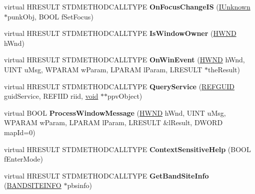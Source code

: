 \begin{DoxyCompactItemize}
\mbox{\label{class_c_menu_site_a1c7703680a564c6ca4ec738bc407d123}} 
virtual H\+R\+E\+S\+U\+LT S\+T\+D\+M\+E\+T\+H\+O\+D\+C\+A\+L\+L\+T\+Y\+PE {\bfseries On\+Focus\+Change\+IS} (\hyperlink{interface_i_unknown}{I\+Unknown} $\ast$punk\+Obj, B\+O\+OL f\+Set\+Focus)
\item 
\mbox{\label{class_c_menu_site_a9c4a22553dc2d656175490a6fb8f8219}} 
virtual H\+R\+E\+S\+U\+LT S\+T\+D\+M\+E\+T\+H\+O\+D\+C\+A\+L\+L\+T\+Y\+PE {\bfseries Is\+Window\+Owner} (\hyperlink{interfacevoid}{H\+W\+ND} h\+Wnd)
\item 
\mbox{\label{class_c_menu_site_a88747fce17098e675ace25ba0f56134f}} 
virtual H\+R\+E\+S\+U\+LT S\+T\+D\+M\+E\+T\+H\+O\+D\+C\+A\+L\+L\+T\+Y\+PE {\bfseries On\+Win\+Event} (\hyperlink{interfacevoid}{H\+W\+ND} h\+Wnd, U\+I\+NT u\+Msg, W\+P\+A\+R\+AM w\+Param, L\+P\+A\+R\+AM l\+Param, L\+R\+E\+S\+U\+LT $\ast$the\+Result)
\item 
\mbox{\label{class_c_menu_site_a1f7cc371685ec5842a9d208fd50d99c5}} 
virtual H\+R\+E\+S\+U\+LT S\+T\+D\+M\+E\+T\+H\+O\+D\+C\+A\+L\+L\+T\+Y\+PE {\bfseries Query\+Service} (\hyperlink{struct___g_u_i_d}{R\+E\+F\+G\+U\+ID} guid\+Service, R\+E\+F\+I\+ID riid, \hyperlink{interfacevoid}{void} $\ast$$\ast$ppv\+Object)
\item 
\mbox{\label{class_c_menu_site_a8d4332503f6746e9443c902bd668edee}} 
virtual B\+O\+OL {\bfseries Process\+Window\+Message} (\hyperlink{interfacevoid}{H\+W\+ND} h\+Wnd, U\+I\+NT u\+Msg, W\+P\+A\+R\+AM w\+Param, L\+P\+A\+R\+AM l\+Param, L\+R\+E\+S\+U\+LT \&l\+Result, D\+W\+O\+RD map\+Id=0)
\item 
\mbox{\label{class_c_menu_site_a62e0f7f91bcb8cd8c601463cb623179f}} 
virtual H\+R\+E\+S\+U\+LT S\+T\+D\+M\+E\+T\+H\+O\+D\+C\+A\+L\+L\+T\+Y\+PE {\bfseries Context\+Sensitive\+Help} (B\+O\+OL f\+Enter\+Mode)
\item 
\mbox{\label{class_c_menu_site_ad7f3ad621bc497dc4660a081f1f29e2e}} 
virtual H\+R\+E\+S\+U\+LT S\+T\+D\+M\+E\+T\+H\+O\+D\+C\+A\+L\+L\+T\+Y\+PE {\bfseries Get\+Band\+Site\+Info} (\hyperlink{structtag_b_a_n_d_s_i_t_e_i_n_f_o}{B\+A\+N\+D\+S\+I\+T\+E\+I\+N\+FO} $\ast$pbsinfo)
$$
\end{DoxyCompactItemize}
